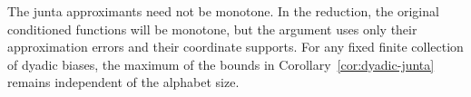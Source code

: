 \begin{remark}
The junta approximants need not be monotone.  In the reduction, the
original conditioned functions will be monotone, but the argument
uses only their approximation errors and their coordinate supports.
For any fixed finite collection of dyadic biases, the maximum of the
bounds in Corollary~\ref{cor:dyadic-junta} remains independent of the
alphabet size.
\end{remark}
